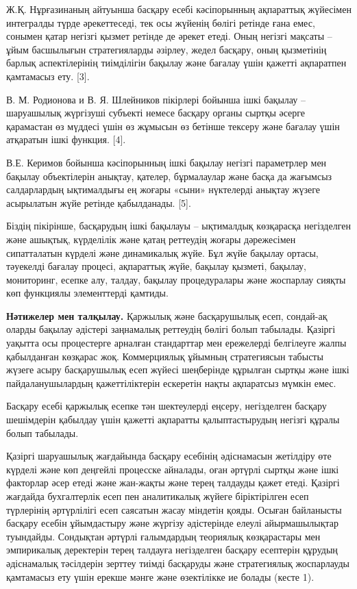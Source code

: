 \begin{multicols}{2}
Ж.Қ. Нұрғазинаның айтуынша басқару есебі кәсіпорынның ақпараттық
жүйесімен интегралды түрде әрекеттеседі, тек осы жүйенің бөлігі ретінде
ғана емес, сонымен қатар негізгі қызмет ретінде де әрекет етеді. Оның
негізгі мақсаты -- ұйым басшылығын стратегияларды әзірлеу, жедел
басқару, оның қызметінің барлық аспектілерінің тиімділігін бақылау және
бағалау үшін қажетті ақпаратпен қамтамасыз ету. {[}3{]}.

В. М. Родионова и В. Я. Шлейников пікірлері бойынша ішкі бақылау --
шаруашылық жүргізуші субъекті немесе басқару органы сыртқы әсерге
қарамастан өз мүддесі үшін өз жұмысын өз бетінше тексеру және бағалау
үшін атқаратын ішкі функция. {[}4{]}.

В.Е. Керимов бойынша кәсіпорынның ішкі бақылау негізгі параметрлер мен
бақылау объектілерін анықтау, қателер, бұрмалаулар және басқа да
жағымсыз салдарлардың ықтималдығы ең жоғары «сыни» нүктелерді анықтау
жүзеге асырылатын жүйе ретінде қабылданады. {[}5{]}.

Біздің пікірінше, басқарудың ішкі бақылауы -- ықтималдық көзқарасқа
негізделген және ашықтық, күрделілік және қатаң реттеудің жоғары
дәрежесімен сипатталатын күрделі және динамикалық жүйе. Бұл жүйе бақылау
ортасы, тәуекелді бағалау процесі, ақпараттық жүйе, бақылау қызметі,
бақылау, мониторинг, есепке алу, талдау, бақылау процедуралары және
жоспарлау сияқты көп функциялы элементтерді қамтиды.

{\bfseries Нәтижелер мен талқылау.} Қаржылық және басқарушылық есеп,
сондай-ақ оларды бақылау әдістері заңнамалық реттеудің бөлігі болып
табылады. Қазіргі уақытта осы процестерге арналған стандарттар мен
ережелерді белгілеуге жалпы қабылданған көзқарас жоқ. Коммерциялық
ұйымның стратегиясын табысты жүзеге асыру басқарушылық есеп жүйесі
шеңберінде құрылған сыртқы және ішкі пайдаланушылардың қажеттіліктерін
ескеретін нақты ақпаратсыз мүмкін емес.

Басқару есебі қаржылық есепке тән шектеулерді еңсеру, негізделген
басқару шешімдерін қабылдау үшін қажетті ақпаратты қалыптастырудың
негізгі құралы болып табылады.

Қазіргі шаруашылық жағдайында басқару есебінің әдіснамасын жетілдіру өте
күрделі және көп деңгейлі процесске айналады, оған әртүрлі сыртқы және
ішкі факторлар әсер етеді және жан-жақты және терең талдауды қажет
етеді. Қазіргі жағдайда бухгалтерлік есеп пен аналитикалық жүйеге
біріктірілген есеп түрлерінің әртүрлілігі есеп саясатын жасау міндетін
қояды. Осыған байланысты басқару есебін ұйымдастыру және жүргізу
әдістерінде елеулі айырмашылықтар туындайды. Сондықтан әртүрлі
ғалымдардың теориялық көзқарастары мен эмпирикалық деректерін терең
талдауға негізделген басқару есептерін құрудың әдіснамалық тәсілдерін
зерттеу тиімді басқаруды және стратегиялық жоспарлауды қамтамасыз ету
үшін ерекше мәнге және өзектілікке ие болады (кесте 1).
\end{multicols}


